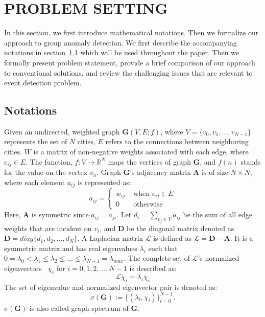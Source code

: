 \documentclass[conference]{IEEEtran}
\begin{document}
\section{PROBLEM SETTING}
\label{sec:problem}
In this section, we first introduce mathematical notations. Then we formalize our approach to group anomaly detection.
We first describe the accompanying notations in section~\ref{sec:notations} which will be used throughout the paper.
Then we formally present problem statement, provide a brief comparison of our approach to conventional solutions, and review the challenging issues that are relevant to event detection problem.
\subsection{Notations}
\label{sec:notations}
Given an undirected, weighted graph $\mathbf{G}(V,E;f)$, where $V=\{v_0,v_1,...,v_{N-1}\}$ represents the set of $N$ cities, $E$ refers to the connections between neighboring cities. $W$ is a matrix of non-negative weights associated with each edge, where $e_{ij}\in E$. The function, $f: V \rightarrow {\mathbb{R}}^N$ maps the vertices of graph $\mathbf{G}$, and $f(n)$ stands for the value on the vertex $v_n$. Graph $\mathbf{G}$'s adjacency matrix $\mathbf{A}$ is of size $N\times N$, where each element $a_{ij}$ is represented as:
\begin{equation}
a_{ij} = \left\{ \begin{array}{rl}
 w_{ij} &\mbox{ when $e_{ij}\in {E}$} \\
  0 &\mbox{ otherwise}
       \end{array} \right.
\end{equation}
Here, $\mathbf{A}$ is symmetric since $a_{ij}=a_{ji}$.
Let $d_i=\sum\limits_{v_j \in V}a_{ij}$ be the sum of all edge weights that are incident on $v_i$, and $\mathbf{D}$ be the diagonal matrix denoted as $\mathbf{D}=diag\{d_1,d_2,\ldots,d_N\}$. A Laplacian matrix $\mathcal{L}$ is defined as $\mathcal{L}=\mathbf{D-A}$. It is a symmetric matrix and has real eigenvalues $\lambda_{i}$ such that $0 = \lambda_{0} < \lambda_{1} \leq \lambda_{2} \leq \ldots \leq \lambda_{N-1} = \lambda_{max}$. The complete set of $\mathcal{L}$'s normalized eigenvectors~\cite{bapat2010graphs} $\chi_{i}$ for $i=0,1,2,...,N-1$ is described as:
\begin{equation}
\label{eq:eigenvalues}
\mathcal{L}\chi_{i}=\lambda_{i}\chi_{i}
\end{equation}
The set of eigenvalue and normalized eigenvector pair is denoted as:
\begin{equation}
\label{eq:spectrum}
\sigma({\mathbf{G}}):=\{(\lambda_l,\chi_l)\}_{l=0}^{N-1}.
\end{equation}$\sigma({\mathbf{G}})$ is also called graph spectrum of $\mathbf{G}$.
\end{document}

